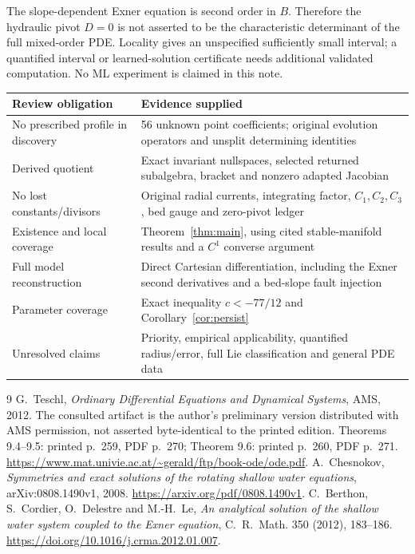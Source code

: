 \documentclass[11pt]{article}
\theoremstyle{remark}\newtheorem{remark}[theorem]{Remark}
\begin{document}
The slope-dependent Exner equation is second order in $B$. Therefore the
hydraulic pivot $D=0$ is not asserted to be the characteristic determinant
of the full mixed-order PDE. Locality gives an unspecified sufficiently
small interval; a quantified interval or learned-solution certificate needs
additional validated computation. No ML experiment is claimed in this note.

\begin{center}\small
\begin{tabularx}{\textwidth}{@{}lX@{}}\toprule
Review obligation&Evidence supplied\\\midrule
No prescribed profile in discovery&56 unknown point coefficients; original evolution operators and unsplit determining identities\\
Derived quotient&Exact invariant nullspaces, selected returned subalgebra, bracket and nonzero adapted Jacobian\\
No lost constants/divisors&Original radial currents, integrating factor, $C_1,C_2,C_3$, bed gauge and zero-pivot ledger\\
Existence and local coverage&Theorem~\ref{thm:main}, using cited stable-manifold results and a $C^1$ converse argument\\
Full model reconstruction&Direct Cartesian differentiation, including the Exner second derivatives and a bed-slope fault injection\\
Parameter coverage&Exact inequality $c<-77/12$ and Corollary~\ref{cor:persist}\\
Unresolved claims&Priority, empirical applicability, quantified radius/error, full Lie classification and general PDE data\\\bottomrule
\end{tabularx}
\end{center}

\begin{thebibliography}{9}
 G.~Teschl, \emph{Ordinary Differential Equations and Dynamical
Systems}, AMS, 2012. The consulted artifact is the author's preliminary
version distributed with AMS permission, not asserted byte-identical to the
printed edition. Theorems 9.4--9.5: printed p.~259, PDF p.~270;
Theorem 9.6: printed p.~260, PDF p.~271.
\url{https://www.mat.univie.ac.at/~gerald/ftp/book-ode/ode.pdf}.
 A.~Chesnokov, \emph{Symmetries and exact solutions of the
rotating shallow water equations}, arXiv:0808.1490v1, 2008.
\url{https://arxiv.org/pdf/0808.1490v1}.
 C.~Berthon, S.~Cordier, O.~Delestre and M.-H.~Le,
\emph{An analytical solution of the shallow water system coupled to the
Exner equation}, C.~R.~Math. 350 (2012), 183--186.
\url{https://doi.org/10.1016/j.crma.2012.01.007}.
\end{thebibliography}
\end{document}
